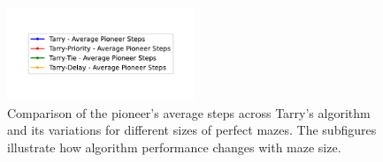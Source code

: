 \begin{figure}[H]
    \centering
    \qquad
    \qquad
    \includegraphics[width=0.5\textwidth]{Cap3/tarry_var_steps_legend.pdf}
    \newline
    \qquad
    \newline
    \qquad
    \caption{Comparison of the pioneer's average steps across Tarry's algorithm and its variations for different sizes of perfect mazes. The subfigures illustrate how algorithm performance changes with maze size.}
    \label{fig_tarry_steps_all_sizes_maze}
\end{figure}

